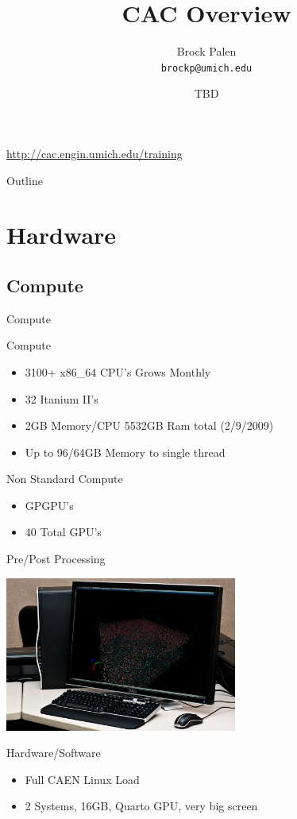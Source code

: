 \documentclass[handout]{beamer}
\title[CAC Overview] {CAC Overview}
\author{Brock Palen\\ \texttt{brockp@umich.edu}}
\date{TBD}
\begin{document}
  \begin{frame}
    \titlepage
    \url{http://cac.engin.umich.edu/training}
  \end{frame}

  \begin{frame}{Outline}
    \tableofcontents
  \end{frame}
  
  \section {Hardware}
   \subsection{Compute}
    \begin{frame}{Compute}
     \begin{block}{Compute}
      \begin{itemize}
       \item{3100+ x86\_64 CPU's Grows Monthly}
       \item{32 Itanium II's}
       \item{2GB Memory/CPU 5532GB Ram total (2/9/2009)}
       \item{Up to 96/64GB Memory to single thread}
      \end{itemize}
     \end{block}
     \begin{block}{Non Standard Compute}
      \begin{itemize}
       \item<2->{GPGPU's}
       \item<2->{40 Total GPU's}
      \end{itemize}
     \end{block}
    \end{frame}
    \begin{frame}{Pre/Post Processing}
      \begin{center}\includegraphics[height=2.0in]{3dlab}\end{center}
      \begin{block}{Hardware/Software}
       \begin{itemize}
         \item Full CAEN Linux Load
         \item 2 Systems, 16GB, Quarto GPU, very big screen
       \end{itemize}
      \end{block}
    \end{frame}
\end{document}
